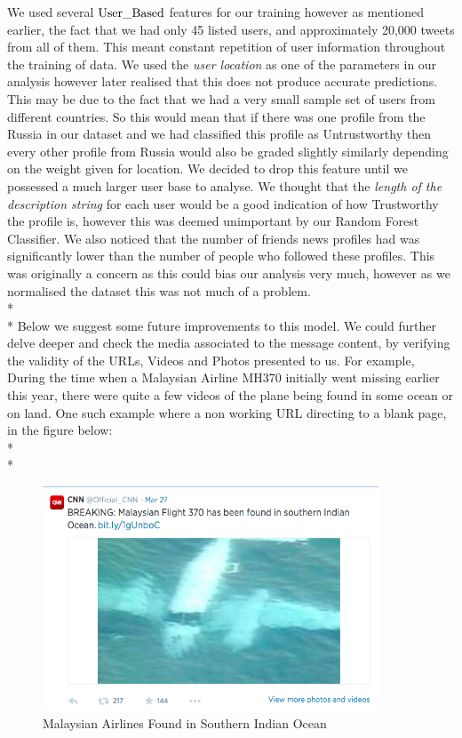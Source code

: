We used several $\textup{User\_Based}$ features for our training however as mentioned earlier, the fact that we had only 45 listed users, and approximately 20,000 tweets from all of them. This meant constant repetition of user information throughout the training of data. We used the \textit{user location} as one of the parameters in our analysis however later realised that this does not produce accurate predictions. This may be due to the fact that we had a very small sample set of users from different countries.  So this would mean that if there was one profile from the Russia in our dataset and we had classified this profile as Untrustworthy then every other profile from Russia would also be graded slightly similarly depending on the weight given for location. We decided to drop this feature until we possessed a much larger user base to analyse. We thought that the \textit{length of the description string} for each user would be a good indication of how Trustworthy the profile is, however this was deemed unimportant by our Random Forest Classifier. We also noticed that the number of friends news profiles had was significantly lower than the number of people who followed these profiles. This was originally a concern as this could bias our analysis very much, however as we normalised the dataset this was not much of a problem. \\*\\* 
\noindent 
Below we suggest some future improvements to this model. We could further delve deeper and check the media associated to the message content, by verifying the validity of the URLs, Videos and Photos presented to us. For example, During the time when a Malaysian Airline MH370 initially went missing earlier this year, there were quite a few videos of the plane being found in some ocean or on land. One such example where a non working URL directing to a blank page, in the figure below:\\*\\*
\begin{figure}[hb]
  \centering
\includegraphics[width=10cm]{MalaysianAIrlines}
  \caption[MH370]
   {Malaysian Airlines Found in Southern Indian Ocean}
\end{figure}\leavevmode\\

